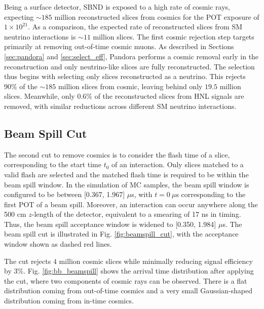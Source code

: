 Being a surface detector, SBND is exposed to a high rate of cosmic rays, expecting $\sim 185$ million reconstructed slices from cosmics for the POT exposure of $1 \times 10^{21}$.
As a comparison, the expected rate of reconstructed slices from SM neutrino interactions is $\sim 11$ million slices.
The first cosmic rejection step targets primarily at removing out-of-time cosmic muons.
As described in Sections \ref{sec:pandora} and \ref{sec:select_eff}, Pandora performs a cosmic removal early in the reconstruction and only neutrino-like slices are fully reconstructed. 
The selection thus begins with selecting only slices reconstructed as a neutrino.
This rejects $90 \%$ of the $\sim 185$ million slices from cosmic, leaving behind only $19.5$ million slices.
Meanwhile, only $0.6 \%$ of the reconstructed slices from HNL signals are removed, with similar reductions across different SM neutrino interactions.  

\subsection{Beam Spill Cut}
\label{sec:cosmic_spill}

The second cut to remove cosmics is to consider the flash time of a slice, corresponding to the start time $t_0$ of an interaction. 
Only slices matched to a valid flash are selected and the matched flash time is required to be within the beam spill window.
In the simulation of MC samples, the beam spill window is configured to be between [0.367, 1.967] $\mu$s, with $t = 0\ \mu$s corresponding to the first POT of a beam spill.
Moreover, an interaction can occur anywhere along the 500 cm $z$-length of the detector, equivalent to a smearing of 17 ns in timing.
Thus, the beam spill acceptance window is widened to [0.350, 1.984] $\mu$s.
The beam spill cut is illustrated in Fig. \ref{fig:beamspill_cut}, with the acceptance window shown as dashed red lines.

The cut rejects $4$ million cosmic slices while minimally reducing signal efficiency by $3\%$.
Fig. \ref{fig:bb_beamspill} shows the arrival time distribution after applying the cut, where two components of cosmic rays can be observed.
There is a flat distribution coming from out-of-time cosmics and a very small Gaussian-shaped distribution coming from in-time cosmics.

